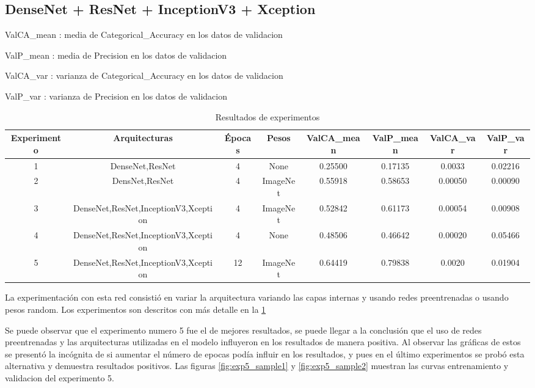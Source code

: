 \documentclass[article]{llncs}
\begin{document}
\subsection{DenseNet + ResNet + InceptionV3 + Xception}

ValCA\_mean : media de Categorical\_Accuracy en los datos de validacion

ValP\_mean : media de Precision en los datos de validacion

ValCA\_var : varianza de Categorical\_Accuracy en los datos de validacion

ValP\_var : varianza de Precision en los datos de validacion

\begin{table}[h]
    \centering
    \begin{tabular}{|c|c|c|c|c|c|c|c|}
    \hline
    Experimento & Arquitecturas & Épocas & Pesos & ValCA\_mean & ValP\_mean & ValCA\_var & ValP\_var \\
    \hline
    1 & DenseNet,ResNet & 4 & None & 0.25500 & 0.17135 & 0.0033 & 0.02216 \\
    2 & DensNet,ResNet & 4 & ImageNet & 0.55918 & 0.58653 & 0.00050 & 0.00090 \\
    3 & DenseNet,ResNet,InceptionV3,Xception & 4 & ImageNet & 0.52842 & 0.61173 & 0.00054 & 0.00908 \\
    4 & DenseNet,ResNet,InceptionV3,Xception & 4 & None & 0.48506 & 0.46642 & 0.00020 & 0.05466 \\
    5 & DenseNet,ResNet,InceptionV3,Xception & 12 & ImageNet & 0.64419 & 0.79838 & 0.0020 & 0.01904 \\
    \hline
    \end{tabular}
    \caption{Resultados de experimentos}
    \label{tab:resultados1}
    \end{table}

La experimentaci\'on con esta red consisti\'o en variar la arquitectura variando las capas internas y usando redes 
preentrenadas o usando pesos random. Los experimentos son descritos con m\'as detalle en la \ref{tab:resultados1}

Se puede observar que el experimento numero 5 fue el de mejores resultados, se puede llegar a la conclusión que el uso de 
redes preentrenadas y las arquitecturas utilizadas en el modelo influyeron en los resultados de manera positiva. Al observar 
las gráficas de estos se presentó la incógnita de si aumentar el número de epocas podía influir en los resultados, y pues en 
el último experimentos se probó esta alternativa y demuestra resultados positivos. Las figuras \ref{fig:exp5_sample1} y
\ref{fig:exp5_sample2} muestran las curvas entrenamiento y validacion del experimento 5.
\end{document}
